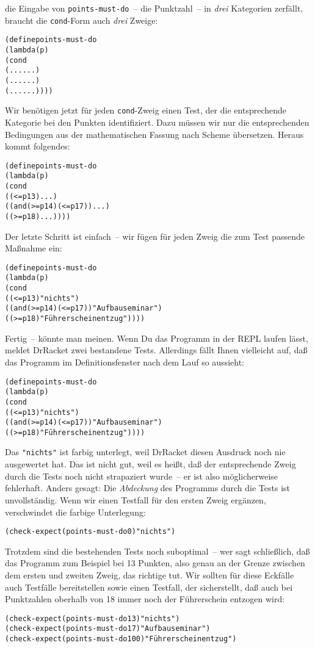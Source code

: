 die Eingabe von \texttt{points-must-do}~-- die Punktzahl~-- in
\emph{drei} Kategorien zerfällt, braucht die \texttt{cond}-Form auch
\emph{drei} Zweige:
%
\begin{alltt}
(define points-must-do
  (lambda (p)
    (cond
      (... ...)
      (... ...)
      (... ...))))
\end{alltt}
%
Wir benötigen jetzt für jeden \texttt{cond}-Zweig einen Test, der die
entsprechende Kategorie bei den Punkten identifiziert.  Dazu müssen
wir nur die entsprechenden Bedingungen aus der mathematischen Fassung
nach Scheme übersetzen.  Heraus kommt folgendes:
%
\begin{alltt}
(define points-must-do
  (lambda (p)
    (cond
      ((<= p 13) ...)
      ((and (>= p 14) (<= p 17)) ...)
      ((>= p 18) ...))))
\end{alltt}
%
Der letzte Schritt ist einfach~-- wir fügen für jeden Zweig die zum
Test passende Maßnahme ein:
%
\begin{alltt}
(define points-must-do
  (lambda (p)
    (cond
      ((<= p 13) "nichts")
      ((and (>= p 14) (<= p 17)) "Aufbauseminar")
      ((>= p 18) "Führerscheinentzug"))))
\end{alltt}
%
Fertig~-- könnte man meinen.  Wenn Du das Programm in der REPL laufen lässt,
meldet DrRacket zwei bestandene Tests.  Allerdings fällt Ihnen
vielleicht auf, daß das Programm im Definitionsfenster nach dem Lauf
so aussieht:
%
\begin{alltt}
(define points-must-do
  (lambda (p)
    (cond
      ((<= p 13) \colorbox{featuregray}{"nichts"})
      ((and (>= p 14) (<= p 17)) "Aufbauseminar")
      ((>= p 18) "Führerscheinentzug"))))
\end{alltt}
%
Das \verb|"nichts"| ist farbig unterlegt, weil DrRacket diesen
Ausdruck noch nie ausgewertet hat.  Das ist nicht gut, weil es heißt,
daß der entsprechende Zweig durch die Tests noch nicht strapaziert
wurde~-- er ist also möglicherweise fehlerhaft.  Anders gesagt: Die
\textit{Abdeckung} des Programms durch die Tests ist
unvollständig.  Wenn wir einen Testfall für den ersten Zweig ergänzen,
verschwindet die farbige Unterlegung:
%
\begin{alltt}
(check-expect (points-must-do 0) "nichts")
\end{alltt}
%
Trotzdem sind die bestehenden Tests noch suboptimal~-- wer sagt
schließlich, daß das Programm zum Beispiel bei 13 Punkten, also genau
an der Grenze zwischen dem ersten und zweiten Zweig, das richtige tut.
Wir sollten für diese Eckfälle auch Testfälle
bereitstellen sowie einen Testfall, der sicherstellt, daß auch bei
Punktzahlen oberhalb von 18 immer noch der Führerschein entzogen wird:
%
\begin{alltt}
(check-expect (points-must-do 13) "nichts")
(check-expect (points-must-do 17) "Aufbauseminar")
(check-expect (points-must-do 100) "Führerscheinentzug")
\end{alltt}

